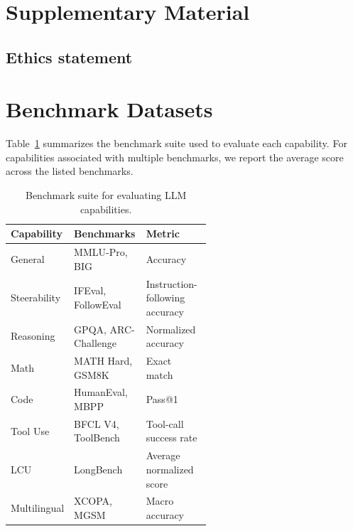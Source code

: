 \section*{Supplementary Material}

\subsection*{Ethics statement}



\section{Benchmark Datasets}\label{sec:bench_datasets}

Table~\ref{tab:capabilities-benchmarks} summarizes the benchmark suite used to
evaluate each capability. For capabilities associated with multiple benchmarks,
we report the average score across the listed benchmarks.


\begin{table}[h]
  \centering
  \caption{Benchmark suite for evaluating LLM capabilities.}
  \label{tab:capabilities-benchmarks}
  \small
  \setlength{\tabcolsep}{4pt}
  \renewcommand{\arraystretch}{0.95}

  \begin{tabularx}{\linewidth}{@{}
    >{\raggedright\arraybackslash}p{0.20\linewidth}
    >{\raggedright\arraybackslash}p{0.36\linewidth}
    >{\raggedright\arraybackslash}X
  @{}}
    \toprule
    \textbf{Capability} & \textbf{Benchmarks} & \textbf{Metric} \\
    \midrule
    General      & MMLU-Pro, BIG       & Accuracy \\
    Steerability & IFEval, FollowEval  & Instruction-following accuracy \\
    Reasoning    & GPQA, ARC-Challenge & Normalized accuracy \\
    Math         & MATH Hard, GSM8K    & Exact match \\
    Code         & HumanEval, MBPP     & Pass@1 \\
    Tool Use     & BFCL V4, ToolBench  & Tool-call success rate \\
    LCU          & LongBench           & Average normalized score \\
    Multilingual & XCOPA, MGSM         & Macro accuracy \\
    \bottomrule
  \end{tabularx}
\end{table}

